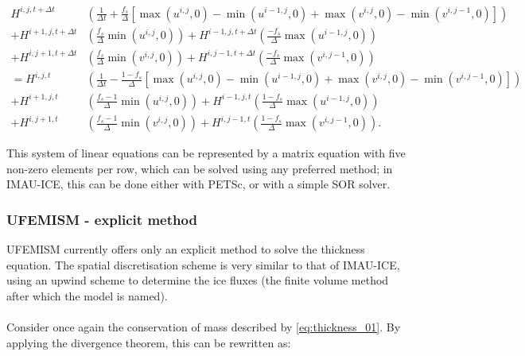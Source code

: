 \documentclass{article}
\begin{document}
\begin{equation} \label{eq:thickness_08}
\begin{split}
H^{i,j,t+\Delta t} & \left( \frac{1}{\Delta t} + \frac{f_s}{\Delta} \left[
\max \left( u^{i,j},0\right) - \min \left( u^{i-1,j},0\right) + 
\max \left( v^{i,j},0\right) - \min \left( v^{i,j-1},0\right) \right] \right) \\
+ H^{i+1,j,t+\Delta t} & \left( \frac{f_s}{\Delta} \min \left( u^{i,j},0\right) \right)
+ H^{i-1,j,t+\Delta t} \left( \frac{-f_s}{\Delta} \max \left( u^{i-1,j},0\right) \right) \\
+ H^{i,j+1,t+\Delta t} & \left( \frac{f_s}{\Delta} \min \left( v^{i,j},0\right) \right)
+ H^{i,j-1,t+\Delta t} \left( \frac{-f_s}{\Delta} \max \left( v^{i,j-1},0\right) \right) \\
= H^{i,j,t} & \left( \frac{1}{\Delta t} - \frac{1-f_s}{\Delta} \left[ 
\max \left( u^{i,j},0\right) - \min \left( u^{i-1,j},0\right) + 
\max \left( v^{i,j},0\right) - \min \left( v^{i,j-1},0\right) \right] \right) \\
+ H^{i+1,j,t} & \left( \frac{f_s - 1}{\Delta} \min \left( u^{i,j},0 \right) \right)
+ H^{i-1,j,t} \left( \frac{1 - f_s}{\Delta} \max \left( u^{i-1,j},0 \right) \right) \\
+ H^{i,j+1,t} & \left( \frac{f_s - 1}{\Delta} \min \left( v^{i,j},0 \right) \right)
+ H^{i,j-1,t} \left( \frac{1 - f_s}{\Delta} \max \left( v^{i,j-1},0 \right) \right).
\end{split}
\end{equation}

This system of linear equations can be represented by a matrix equation with five non-zero elements per row, which can be solved using any preferred method; in IMAU-ICE, this can be done either with PETSc, or with a simple SOR solver.

\subsubsection{UFEMISM - explicit method}

UFEMISM currently offers only an explicit method to solve the thickness equation. The spatial discretisation scheme is very similar to that of IMAU-ICE, using an upwind scheme to determine the ice fluxes (the finite volume method after which the model is named).\\
\\
Consider once again the conservation of mass described by \eqref{eq:thickness_01}. By applying the divergence theorem, this can be rewritten as:
\end{document}
